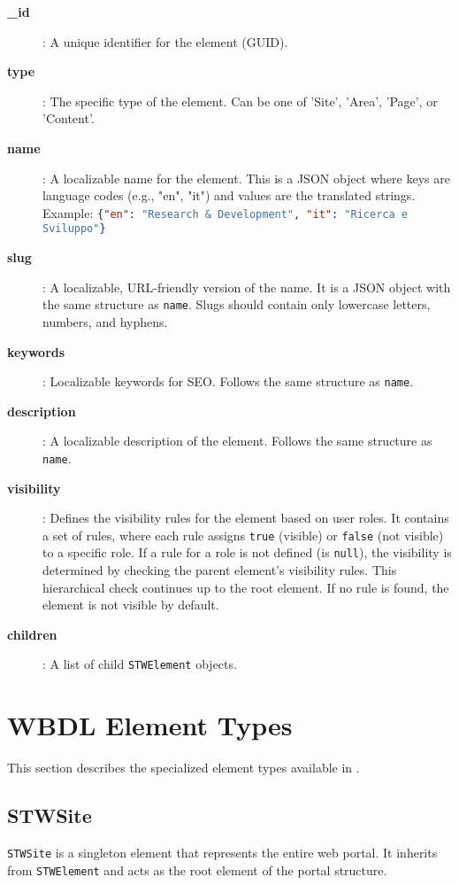\begin{description}
\item[\textbf{\_id}]: A unique identifier for the element (GUID).
\item[\textbf{type}]: The specific type of the element. Can be one of 'Site', 'Area', 'Page', or 'Content'.
\item[\textbf{name}]: A localizable name for the element. This is a JSON object where keys are language codes (e.g., "en", "it") and values are the translated strings. Example: \lstinline[language=JSON]|{"en": "Research & Development", "it": "Ricerca e Sviluppo"}|
\item[\textbf{slug}]: A localizable, URL-friendly version of the name. It is a JSON object with the same structure as \texttt{name}. Slugs should contain only lowercase letters, numbers, and hyphens.
\item[\textbf{keywords}]: Localizable keywords for SEO. Follows the same structure as \texttt{name}.
\item[\textbf{description}]: A localizable description of the element. Follows the same structure as \texttt{name}.
\item[\textbf{visibility}]: Defines the visibility rules for the element based on user roles. It contains a set of rules, where each rule assigns \texttt{true} (visible) or \texttt{false} (not visible) to a specific role. If a rule for a role is not defined (is \texttt{null}), the visibility is determined by checking the parent element's visibility rules. This hierarchical check continues up to the root element. If no rule is found, the element is not visible by default.
\item[\textbf{children}]: A list of child \texttt{STWElement} objects.
\end{description}

\section{WBDL Element Types}
\label{sec:wbdl-element-types}

This section describes the specialized element types available in \wbdl{}.

\subsection{STWSite}

\texttt{STWSite} is a singleton element that represents the entire web portal. It inherits from \texttt{STWElement} and acts as the root element of the portal structure.

